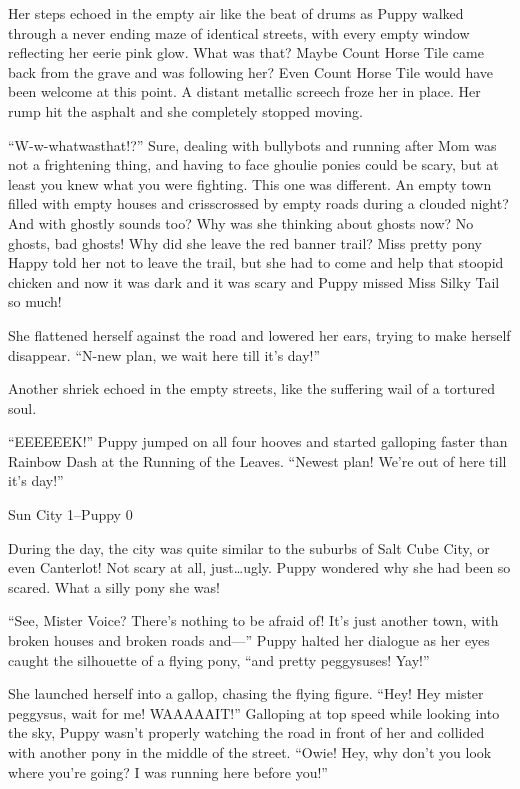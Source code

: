 Her steps echoed in the empty air like the beat of drums as Puppy walked through a never ending maze of identical streets, with every empty window reflecting her eerie pink glow. What was that? Maybe Count Horse Tile came back from the grave and was following her? Even Count Horse Tile would have been welcome at this point. A distant metallic screech froze her in place. Her rump hit the asphalt and she completely stopped moving.

``W-w-whatwasthat!?'' Sure, dealing with bullybots and running after Mom was not a frightening  thing, and having to face ghoulie ponies could be scary, but at least you knew what you were fighting. This one was different. An empty town filled with empty houses and crisscrossed by empty roads during a clouded night? And with ghostly sounds too? Why was she thinking about ghosts now? No ghosts, bad ghosts! Why did she leave the red banner trail? Miss pretty pony Happy told her not to leave the trail, but she had to come and help that stoopid chicken and now it was dark and it was scary and Puppy missed Miss Silky Tail so much!

She flattened herself against the road and lowered her ears, trying to make herself disappear. ``N-new plan, we wait here till it's day!''

Another shriek echoed in the empty streets, like the suffering wail of a tortured soul.

``EEEEEEK!'' Puppy jumped on all four hooves and started galloping faster than Rainbow Dash at the Running of the Leaves. ``Newest plan! We're out of here till it's day!''

\begin{center}
	Sun City 1--Puppy 0
\end{center}

\horizonline


During the day, the city was quite similar to the suburbs of Salt Cube City, or even Canterlot! Not scary at all, just\dots ugly. Puppy wondered why she had been so scared. What a silly pony she was!

``See, Mister Voice? There's nothing to be afraid of! It's just another town, with broken houses and broken roads and---'' Puppy halted her dialogue as her eyes caught the silhouette of a flying pony, ``and pretty peggysuses! Yay!''

She launched herself into a gallop, chasing the flying figure. ``Hey! Hey mister peggysus, wait for me! WAAAAAIT!'' Galloping at top speed while looking into the sky, Puppy wasn't properly watching the road in front of her and collided with another pony in the middle of the street. ``Owie! Hey, why don't you look where you're going? I was running here before you!''

